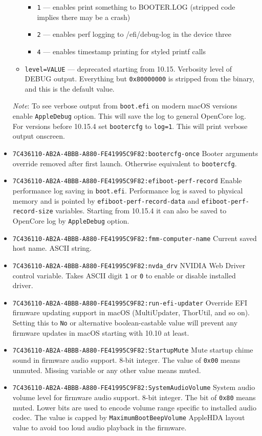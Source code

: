 \documentclass[]{article}
\begin{document}
\begin{itemize}
\begin{itemize}
\begin{itemize}
  \item \texttt{1} --- enables print something to BOOTER.LOG (stripped code implies there
  may be a crash)
  \item \texttt{2} --- enables perf logging to /efi/debug-log in the device three
  \item \texttt{4} --- enables timestamp printing for styled printf calls
  \end{itemize}
  \item \texttt{level=VALUE}  --- deprecated starting from 10.15. Verbosity level of
  DEBUG output. Everything but \texttt{0x80000000} is stripped from the binary,
  and this is the default value.
  \end{itemize}

  \emph{Note}: To see verbose output from \texttt{boot.efi} on modern macOS versions
  enable \texttt{AppleDebug} option. This will save the log to general OpenCore log.
  For versions before 10.15.4 set \texttt{bootercfg} to \texttt{log=1}. This will
  print verbose output onscreen.
\item \texttt{7C436110-AB2A-4BBB-A880-FE41995C9F82:bootercfg-once}
  \break
  Booter arguments override removed after first launch. Otherwise equivalent to \texttt{bootercfg}.
\item
  \texttt{7C436110-AB2A-4BBB-A880-FE41995C9F82:efiboot-perf-record}
  \break
  Enable performance log saving in \texttt{boot.efi}. Performance log is saved to physical
  memory and is pointed by \texttt{efiboot-perf-record-data} and \texttt{efiboot-perf-record-size}
  variables. Starting from 10.15.4 it can also be saved to OpenCore log by \texttt{AppleDebug} option.
\item
  \texttt{7C436110-AB2A-4BBB-A880-FE41995C9F82:fmm-computer-name}
  \break
  Current saved host name. ASCII string.
\item
  \texttt{7C436110-AB2A-4BBB-A880-FE41995C9F82:nvda\_drv}
  \break
  NVIDIA Web Driver control variable. Takes ASCII digit \texttt{1} or \texttt{0}
  to enable or disable installed driver.
\item
  \texttt{7C436110-AB2A-4BBB-A880-FE41995C9F82:run-efi-updater}
  \break
  Override EFI firmware updating support in macOS (MultiUpdater, ThorUtil, and so on).
  Setting this to \texttt{No} or alternative boolean-castable value will prevent
  any firmware updates in macOS starting with 10.10 at least.
\item
  \texttt{7C436110-AB2A-4BBB-A880-FE41995C9F82:StartupMute}
  \break
  Mute startup chime sound in firmware audio support. 8-bit integer.
  The value of \texttt{0x00} means unmuted. Missing variable or any
  other value means muted.
\item
  \texttt{7C436110-AB2A-4BBB-A880-FE41995C9F82:SystemAudioVolume}
  \break
  System audio volume level for firmware audio support. 8-bit integer.
  The bit of \texttt{0x80} means muted. Lower bits are used to encode
  volume range specific to installed audio codec. The value is capped
  by \texttt{MaximumBootBeepVolume} AppleHDA layout value to avoid
  too loud audio playback in the firmware.
\end{itemize}
\end{document}
